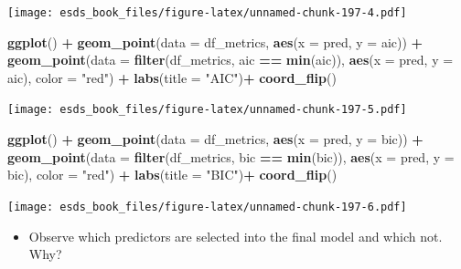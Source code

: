 \documentclass[
]{book}
\newenvironment{Shaded}{\begin{snugshade}}{\end{snugshade}}
\newcommand{\DataTypeTok}[1]{\textcolor[rgb]{0.13,0.29,0.53}{#1}}
\newcommand{\KeywordTok}[1]{\textcolor[rgb]{0.13,0.29,0.53}{\textbf{#1}}}
\newcommand{\NormalTok}[1]{#1}
\newcommand{\OperatorTok}[1]{\textcolor[rgb]{0.81,0.36,0.00}{\textbf{#1}}}
\newcommand{\StringTok}[1]{\textcolor[rgb]{0.31,0.60,0.02}{#1}}
\providecommand{\tightlist}{%
  \setlength{\itemsep}{0pt}\setlength{\parskip}{0pt}}
\begin{document}
\texttt{[image: esds\_book\_files/figure-latex/unnamed-chunk-197-4.pdf]}

\begin{Shaded}
\begin{Highlighting}[]
\KeywordTok{ggplot}\NormalTok{() }\OperatorTok{+}
\StringTok{  }\KeywordTok{geom_point}\NormalTok{(}\DataTypeTok{data =}\NormalTok{ df_metrics, }\KeywordTok{aes}\NormalTok{(}\DataTypeTok{x =}\NormalTok{ pred, }\DataTypeTok{y =}\NormalTok{ aic)) }\OperatorTok{+}
\StringTok{  }\KeywordTok{geom_point}\NormalTok{(}\DataTypeTok{data =} \KeywordTok{filter}\NormalTok{(df_metrics, aic }\OperatorTok{==}\StringTok{ }\KeywordTok{min}\NormalTok{(aic)), }\KeywordTok{aes}\NormalTok{(}\DataTypeTok{x =}\NormalTok{ pred, }\DataTypeTok{y =}\NormalTok{ aic), }\DataTypeTok{color =} \StringTok{"red"}\NormalTok{) }\OperatorTok{+}
\StringTok{  }\KeywordTok{labs}\NormalTok{(}\DataTypeTok{title =} \StringTok{"AIC"}\NormalTok{)}\OperatorTok{+}\StringTok{ }
\StringTok{  }\KeywordTok{coord_flip}\NormalTok{()}
\end{Highlighting}
\end{Shaded}

\texttt{[image: esds\_book\_files/figure-latex/unnamed-chunk-197-5.pdf]}

\begin{Shaded}
\begin{Highlighting}[]
\KeywordTok{ggplot}\NormalTok{() }\OperatorTok{+}
\StringTok{  }\KeywordTok{geom_point}\NormalTok{(}\DataTypeTok{data =}\NormalTok{ df_metrics, }\KeywordTok{aes}\NormalTok{(}\DataTypeTok{x =}\NormalTok{ pred, }\DataTypeTok{y =}\NormalTok{ bic)) }\OperatorTok{+}
\StringTok{  }\KeywordTok{geom_point}\NormalTok{(}\DataTypeTok{data =} \KeywordTok{filter}\NormalTok{(df_metrics, bic }\OperatorTok{==}\StringTok{ }\KeywordTok{min}\NormalTok{(bic)), }\KeywordTok{aes}\NormalTok{(}\DataTypeTok{x =}\NormalTok{ pred, }\DataTypeTok{y =}\NormalTok{ bic), }\DataTypeTok{color =} \StringTok{"red"}\NormalTok{) }\OperatorTok{+}
\StringTok{  }\KeywordTok{labs}\NormalTok{(}\DataTypeTok{title =} \StringTok{"BIC"}\NormalTok{)}\OperatorTok{+}\StringTok{ }
\StringTok{  }\KeywordTok{coord_flip}\NormalTok{()}
\end{Highlighting}
\end{Shaded}

\texttt{[image: esds\_book\_files/figure-latex/unnamed-chunk-197-6.pdf]}

\begin{itemize}
\tightlist
\item
  Observe which predictors are selected into the final model and which not. Why?
\end{itemize}
\end{document}
